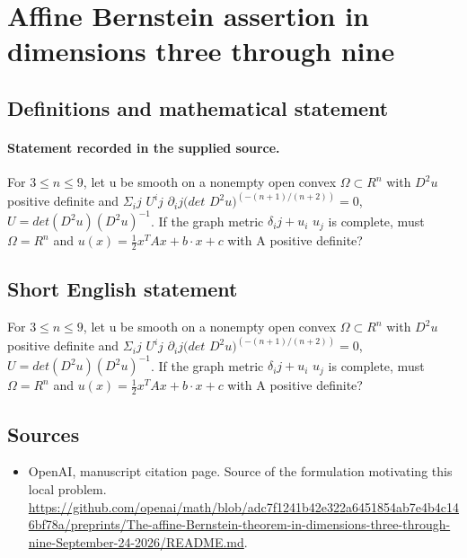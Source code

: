 \documentclass[11pt]{article}
\begin{document}
\section*{Affine Bernstein assertion in dimensions three through nine}\label{30007132}
\subsection{Definitions and mathematical statement}
\paragraph{Statement recorded in the supplied source.}
For $3\leq n\leq 9$, let u be smooth on a nonempty open convex $\Omega \subset R^{n}$ with $D^{2}u$ positive definite and $\Sigma _ij$ $U^ij$ $\partial _ij(det$ $D^{2}u)^(-(n+1)/(n+2))=0$, $U=det(D^{2}u)(D^{2}u)^{-1}$. If the graph metric $\delta _ij+u_i$ $u_j$ is complete, must $\Omega =R^{n}$ and $u(x)=\tfrac12 x^{T}Ax+b\cdot x+c$ with A positive definite?
\subsection{Short English statement}
For $3\leq n\leq 9$, let u be smooth on a nonempty open convex $\Omega \subset R^{n}$ with $D^{2}u$ positive definite and $\Sigma _ij$ $U^ij$ $\partial _ij(det$ $D^{2}u)^(-(n+1)/(n+2))=0$, $U=det(D^{2}u)(D^{2}u)^{-1}$. If the graph metric $\delta _ij+u_i$ $u_j$ is complete, must $\Omega =R^{n}$ and $u(x)=\tfrac12 x^{T}Ax+b\cdot x+c$ with A positive definite?
\subsection{Sources}
\begin{itemize}
\item[S1] OpenAI, manuscript citation page. Source of the formulation motivating this local problem.
\url{https://github.com/openai/math/blob/adc7f1241b42e322a6451854ab7e4b4c146bf78a/preprints/The-affine-Bernstein-theorem-in-dimensions-three-through-nine-September-24-2026/README.md}.
\end{itemize}
\end{document}
